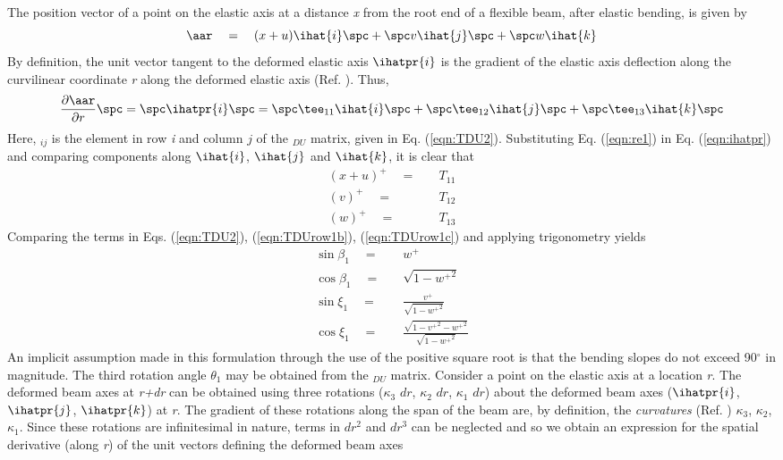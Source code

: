The position vector of a point on the elastic axis at a distance \emph{x} from the root end of a flexible beam, after elastic bending, is given by 
\begin{equation}
\label{eqn:re1}
\aar \quad = \quad (x + u) \ihat{i} \spc   + \spc  v \ihat{j} \spc  + \spc  w \ihat{k}
\end{equation}
By definition, the unit vector tangent to the deformed elastic axis $\ihatpr{i}$ is the gradient of the elastic axis deflection along the curvilinear coordinate \emph{r} along the deformed elastic axis (Ref. \cite{HodgesDowell1}). Thus, 
\begin{equation}
\label{eqn:ihatpr}
\frac{\partial \aar}{\partial r} \spc  = \spc  \ihatpr{i} \spc = \spc  \tee_{11} \ihat{i} \spc  + \spc  \tee_{12} \ihat{j} \spc  + \spc  \tee_{13} \ihat{k} \spc  
\end{equation}
Here, \tee$_{ij}$ is the element in row \emph{i} and column $j$ of the \tee$_{DU}$ matrix, given in Eq. (\ref{eqn:TDU2}). Substituting Eq. (\ref{eqn:re1}) in Eq. (\ref{eqn:ihatpr}) and comparing components along $\ihat{i}$, $\ihat{j}$ and $\ihat{k}$, it is clear that 
\begin{align}
\label{eqn:TDUrow1}
  (x + u)^{+} \quad = & \quad T_{11}  \\
\label{eqn:TDUrow1b}
  (v)^{+} 	  \quad = & \quad T_{12}  \\
  \label{eqn:TDUrow1c}
  (w)^{+}     \quad = & \quad T_{13}  
\end{align}
Comparing the terms in Eqs. (\ref{eqn:TDU2}), (\ref{eqn:TDUrow1b}), (\ref{eqn:TDUrow1c}) and applying trigonometry yields
\begin{align}
\label{eqn:TDUflaplag}
  \sin \beta_1  \quad = & \quad w^+         \\
  \cos \beta_1  \quad = & \quad \sqrt{1 - {w^+}^2}  	\\
  \sin \xi_1  \quad = & \quad \frac{\quad v^+}{\sqrt{1-{w^+}^2}}  \\
  \cos \xi_1  \quad = & \quad \frac{\sqrt{1 - {v^+}^2 - {w^+}^2}}{\sqrt{1-{w^+}^2}} 
\end{align}
An implicit assumption made in this formulation through the use of the positive square root is that the bending slopes do not exceed 90$^\circ$ in magnitude. The third rotation angle $\theta_1$ may be obtained from the \tee$_{DU}$ matrix. Consider a point on the elastic axis at a location \emph{r}. The deformed beam axes at \emph{r+dr} can be obtained using three rotations ($\kappa_3$ $dr$, $\kappa_2$ $dr$, $\kappa_1$ $dr$) about the deformed beam axes ($\ihatpr{i}$, $\ihatpr{j}$, $\ihatpr{k}$) at \emph{r}. The gradient of these rotations along the span of the beam are, by definition, the \emph{curvatures} (Ref. \cite{Kreyszig1997}) $\kappa_3$, $\kappa_2$, $\kappa_1$. Since these rotations are infinitesimal in nature, terms in $dr^2$ and $dr^3$ can be neglected and so we obtain an expression for the spatial derivative (along \emph{r}) of the unit vectors defining the deformed beam axes 
